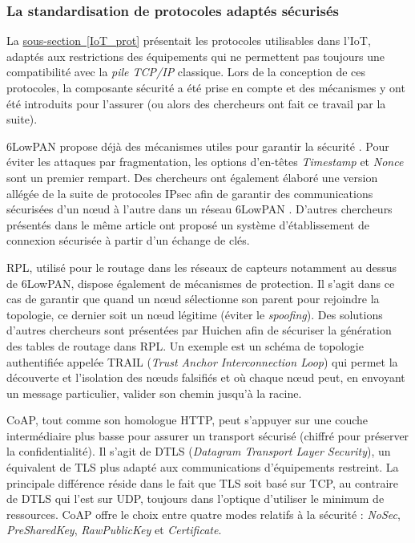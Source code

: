 \documentclass[]{article}
\newcommand{\wordlink}[2]{\hyperref[#1]{#2~\ref{#1}}}
\begin{document}
\subsubsection{La standardisation de protocoles adaptés sécurisés}

\par La \wordlink{IoT_prot}{sous-section} présentait les protocoles utilisables dans l'IoT, adaptés aux restrictions des équipements qui ne permettent pas toujours une compatibilité avec la \textit{pile TCP/IP} classique. Lors de la conception de ces protocoles, la composante sécurité a été prise en compte et des mécanismes y ont été introduits pour l'assurer (ou alors des chercheurs ont fait ce travail par la suite).\\

\par 6LowPAN propose déjà des mécanismes utiles pour garantir la sécurité \cite{wiki6lowpan}. Pour éviter les attaques par fragmentation, les options d'en-têtes \textit{Timestamp} et \textit{Nonce} sont un premier rempart. Des chercheurs ont également élaboré une version allégée de la suite de protocoles IPsec afin de garantir des communications sécurisées d'un nœud à l'autre dans un réseau 6LowPAN \cite{Huichen2016}. D'autres chercheurs présentés dans le même article ont proposé un système d'établissement de connexion sécurisée à partir d'un échange de clés.\\

\par RPL, utilisé pour le routage dans les réseaux de capteurs notamment au dessus de 6LowPAN, dispose également de mécanismes de protection. Il s'agit dans ce cas de garantir que quand un nœud sélectionne son parent pour rejoindre la topologie, ce dernier soit un nœud légitime (éviter le \textit{spoofing}). Des solutions d'autres chercheurs sont présentées par Huichen \cite{Huichen2016} afin de sécuriser la génération des tables de routage dans RPL. Un exemple est un schéma de topologie authentifiée appelée TRAIL (\textit{Trust Anchor Interconnection Loop}) qui permet la découverte et l'isolation des nœuds falsifiés et où chaque nœud peut, en envoyant un message particulier, valider son chemin jusqu'à la racine.\\

\par CoAP, tout comme son homologue HTTP, peut s'appuyer sur une couche intermédiaire plus basse pour assurer un transport sécurisé (chiffré pour préserver la confidentialité). Il s'agit de DTLS (\textit{Datagram Transport Layer Security}), un équivalent de TLS plus adapté aux communications d'équipements restreint. La principale différence réside dans le fait que TLS soit basé sur TCP, au contraire de DTLS qui l'est sur UDP, toujours dans l'optique d'utiliser le minimum de ressources. CoAP offre le choix entre quatre modes relatifs à la sécurité : \textit{NoSec}, \textit{PreSharedKey}, \textit{RawPublicKey} et \textit{Certificate}.
\end{document}

